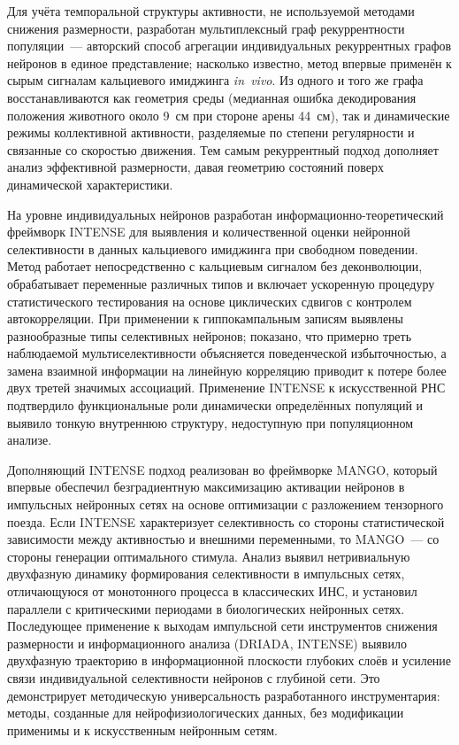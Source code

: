 Для учёта темпоральной структуры активности, не используемой методами снижения размерности, разработан мультиплексный граф рекуррентности популяции~--- авторский способ агрегации индивидуальных рекуррентных графов нейронов в единое представление; насколько известно, метод впервые применён к сырым сигналам кальциевого имиджинга \textit{in~vivo}. Из одного и того же графа восстанавливаются как геометрия среды (медианная ошибка декодирования положения животного около 9~см при стороне арены 44~см), так и динамические режимы коллективной активности, разделяемые по степени регулярности и связанные со скоростью движения. Тем самым рекуррентный подход дополняет анализ эффективной размерности, давая геометрию состояний поверх динамической характеристики.

На уровне индивидуальных нейронов разработан информационно-теоретический фреймворк INTENSE для выявления и количественной оценки нейронной селективности в данных кальциевого имиджинга при свободном поведении. Метод работает непосредственно с кальциевым сигналом без деконволюции, обрабатывает переменные различных типов и включает ускоренную процедуру статистического тестирования на основе циклических сдвигов с контролем автокорреляции. При применении к гиппокампальным записям выявлены разнообразные типы селективных нейронов; показано, что примерно треть наблюдаемой мультиселективности объясняется поведенческой избыточностью, а замена взаимной информации на линейную корреляцию приводит к потере более двух третей значимых ассоциаций. Применение INTENSE к искусственной РНС подтвердило функциональные роли динамически определённых популяций и выявило тонкую внутреннюю структуру, недоступную при популяционном анализе.

Дополняющий INTENSE подход реализован во фреймворке MANGO, который впервые обеспечил безградиентную максимизацию активации нейронов в импульсных нейронных сетях на основе оптимизации с разложением тензорного поезда. Если INTENSE характеризует селективность со стороны статистической зависимости между активностью и внешними переменными, то MANGO~--- со стороны генерации оптимального стимула. Анализ выявил нетривиальную двухфазную динамику формирования селективности в импульсных сетях, отличающуюся от монотонного процесса в классических ИНС, и установил параллели с критическими периодами в биологических нейронных сетях. Последующее применение к выходам импульсной сети инструментов снижения размерности и информационного анализа (DRIADA, INTENSE) выявило двухфазную траекторию в информационной плоскости глубоких слоёв и усиление связи индивидуальной селективности нейронов с глубиной сети. Это демонстрирует методическую универсальность разработанного инструментария: методы, созданные для нейрофизиологических данных, без модификации применимы и к искусственным нейронным сетям.


